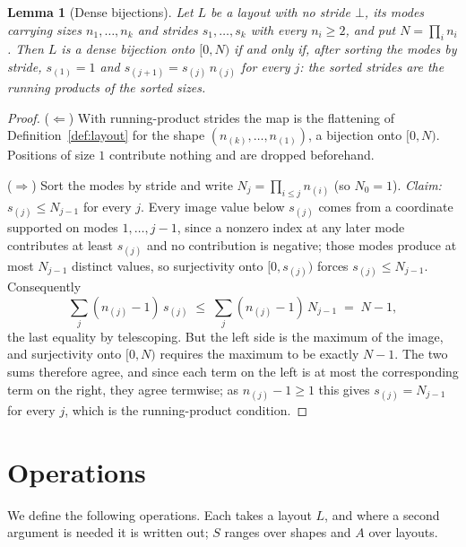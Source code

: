 \documentclass[11pt]{article}
\newtheorem{lemma}{Lemma}
\theoremstyle{definition}
\begin{document}
\begin{lemma}[Dense bijections]\label{lem:dense}
Let $L$ be a layout with no stride $\bot$, its modes carrying sizes
$n_1,\dots,n_k$ and strides $s_1,\dots,s_k$ with every $n_i \ge 2$, and put
$N = \prod_i n_i$. Then $L$ is a dense bijection onto $[0,N)$ if and only if,
after sorting the modes by stride, $s_{(1)} = 1$ and
$s_{(j+1)} = s_{(j)}\,n_{(j)}$ for every $j$: the sorted strides are the
running products of the sorted sizes.
\end{lemma}

\begin{proof}
($\Leftarrow$) With running-product strides the map is the flattening of
Definition~\ref{def:layout} for the shape $(n_{(k)},\dots,n_{(1)})$, a
bijection onto $[0,N)$.
Positions of size $1$ contribute nothing and are dropped beforehand.

($\Rightarrow$) Sort the modes by stride and write $N_j = \prod_{i \le j} n_{(i)}$
(so $N_0 = 1$). \emph{Claim:} $s_{(j)} \le N_{j-1}$ for every $j$. Every image
value below $s_{(j)}$ comes from a coordinate supported on modes
$1,\dots,j{-}1$, since a nonzero index at any later mode contributes at
least $s_{(j)}$ and no contribution is negative; those modes produce at
most $N_{j-1}$ distinct values, so surjectivity onto $[0,s_{(j)})$ forces
$s_{(j)} \le N_{j-1}$. Consequently
\[
\textstyle\sum_j (n_{(j)}-1)\,s_{(j)} \;\le\; \sum_j (n_{(j)}-1)\,N_{j-1}
\;=\; N - 1,
\]
the last equality by telescoping. But the left side is the maximum of the
image, and surjectivity onto $[0,N)$ requires the maximum to be exactly
$N-1$. The two sums therefore agree, and since each term on the left is at most
the corresponding term on the right, they agree termwise; as
$n_{(j)} - 1 \ge 1$ this gives $s_{(j)} = N_{j-1}$ for every $j$, which is the
running-product condition.
\end{proof}

\section{Operations}\label{sec:ops}

We define the following operations. Each takes a layout $L$, and where a second
argument is needed it is written out; $S$ ranges over shapes and $A$ over
layouts.
\end{document}
